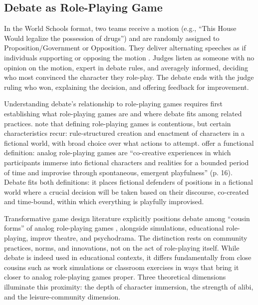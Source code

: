 \subsection{Debate as Role-Playing Game}

In the World Schools format, two teams receive a motion (e.g., ``This House Would legalize the possession of drugs'') and are randomly assigned to Proposition/Government or Opposition. They deliver alternating speeches as if individuals supporting or opposing the motion \parencite{quinn2009debating}. Judges listen as someone with no opinion on the motion, expert in debate rules, and averagely informed, deciding who most convinced the character they role-play. The debate ends with the judge ruling who won, explaining the decision, and offering feedback for improvement.

Understanding debate's relationship to role-playing games requires first establishing what role-playing games are and where debate fits among related practices. \textcite{zagal2024definitions} note that defining role-playing games is contentious, but certain characteristics recur: rule-structured creation and enactment of characters in a fictional world, with broad choice over what actions to attempt. \textcite{bowman2025transformative} offer a functional definition: analog role-playing games are ``co-creative experiences in which participants immerse into fictional characters and realities for a bounded period of time and improvise through spontaneous, emergent playfulness'' (p. 16). Debate fits both definitions: it places fictional defenders of positions in a fictional world where a crucial decision will be taken based on their discourse, co-created and time-bound, within which everything is playfully improvised.

Transformative game design literature explicitly positions debate among ``cousin forms'' of analog role-playing games \parencite{bowman2014educational,bowman2025transformative}, alongside simulations, educational role-playing, improv theatre, and psychodrama. The distinction rests on community practices, norms, and innovations, not on the act of role-playing itself. While debate is indeed used in educational contexts, it differs fundamentally from close cousins such as work simulations or classroom exercises in ways that bring it closer to analog role-playing games proper. Three theoretical dimensions illuminate this proximity: the depth of character immersion, the strength of alibi, and the leisure-community dimension.

